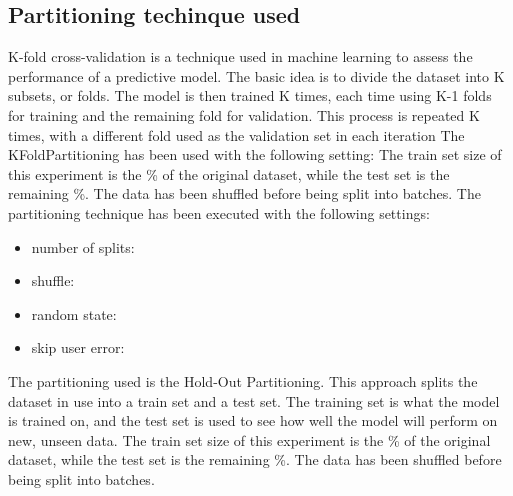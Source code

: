 \documentclass[11pt]{article}
\begin{document}
\subsection{Partitioning techinque used}\label{subsec:partitioning}
K-fold cross-validation is a technique used in machine learning to assess
the performance of a predictive model. The basic idea is to divide the dataset
into K subsets, or folds. The model is then trained K times, each time using K-1
folds for training and the remaining fold for validation. This process is
repeated K times, with a different fold used as the validation set in each iteration
\hfill\break
\hfill\break
The KFoldPartitioning has been used with the following setting:
\hfill\break
\hfill\break
The train set size of this experiment is the \%
of the original dataset, while the test set is the remaining \%.
\hfill\break
\hfill\break
{}
The data has been shuffled before being split into batches.
The partitioning technique has been executed with the following settings:
\begin{itemize}
    \item number of splits: 
    \item shuffle: 
    \item random state: 
    \item skip user error: 
\end{itemize}
\hfill\break
\hfill\break
{}


The partitioning used is the Hold-Out Partitioning.
This approach splits the dataset in use into a train set and a test set.
The training set is what the model is trained on, and the test set is used to see how
well the model will perform on new, unseen data.
\hfill\break
\hfill\break
The train set size of this experiment is the \%
of the original dataset, while the test set is the remaining \%.
\hfill\break
\hfill\break
{}
The data has been shuffled before being split into batches.
\hfill\break
\hfill\break
\end{document}
